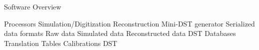 Software Overview


\I Processors
   \I Simulation/Digitization
   \I Reconstruction
   \I Mini-DST generator
\I Serialized data formats
   \I Raw data
   \I Simulated data
   \I Reconstructed data
   \I DST
\I Databases
   \I Translation Tables
   \I Calibrations
   \I DST










